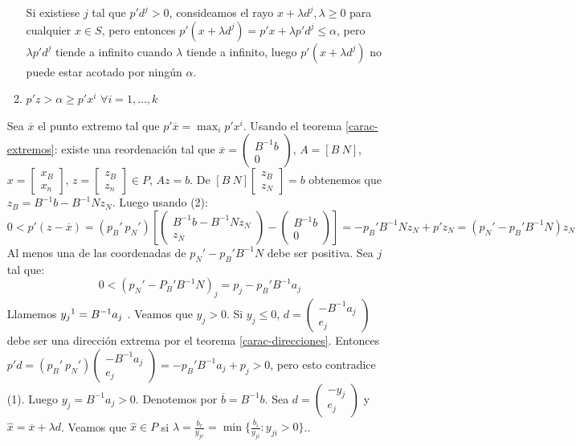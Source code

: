 \documentclass[PM.tex]{subfiles}
\begin{document}
\begin{dem}
\begin{itemize}
\begin{enumerate}
		Si existiese $j$ tal que $p'd^j > 0$, consideamos el rayo $x + λd^j, λ ≥ 0$ para cualquier $x \in S$, pero entonces $p'(x+λd^j) = p'x + λp'd^j ≤ α$, pero $λp'd^j$ tiende a infinito cuando $λ$ tiende a infinito, luego $p'(x+λd^j)$ no puede estar acotado por ningún $α$.
		\item $p'z > α ≥ p'x^i$ $\forall i=1,\dots,k$
	\end{enumerate}
	Sea $\overline{x}$ el punto extremo tal que $p'\overline{x} = \max_i p'x^i$. Usando el teorema \ref{carac-extremos}: existe una reordenación tal que $\overline{x} = \begin{pmatrix}B^{-1}b\\0\end{pmatrix}$, $A = [B\ N]$, $x = \begin{bmatrix}x_B\\x_n\end{bmatrix}$, $z = \begin{bmatrix}z_B\\z_n\end{bmatrix} \in P$, $Az=b$. De $[B\ N]\begin{bmatrix}z_B\\z_N\end{bmatrix} = b$ obtenemos que $z_B = B^{-1}b-B^{-1}Nz_N$. Luego usando (2):
	\[ 0 < p'(z-\overline{x}) = (p_B'\ p_N') \left[\begin{pmatrix}B^{-1}b-B^{-1}Nz_N\\z_N\end{pmatrix}-\begin{pmatrix}B^{-1}b\\0\end{pmatrix}\right] =-p_B'B^{-1}Nz_N + p'z_N = (p_N'-p_B'B^{-1}N)z_N \]
	Al menos una de las coordenadas de $p_N'-p_B'B^{-1}N$ debe ser positiva. Sea $j$ tal que:
	\[ 0 < (p_N'-P_B'B^{-1}N)_j = p_j - p_B'B^{-1}a_j \]
	Llamemos $y_j\footnote{\url{https://www.youtube.com/watch?v=q6EoRBvdVPQ}} = B^{-1}a_j$ . Veamos que $y_j > 0$. Si $y_j ≤ 0$, $d = \begin{pmatrix}-B^{-1}a_j\\e_j\end{pmatrix}$ debe ser una dirección extrema por el teorema \ref{carac-direcciones}. Entonces $p'd = (p_B'\ p_N')\begin{pmatrix}-B^{-1}a_j\\e_j\end{pmatrix}=-p_B'B^{-1}a_j + p_j > 0$, pero esto contradice (1). Luego $y_j = B^{-1}a_j > 0$. Denotemos por $\overline{b}=B^{-1}b$. Sea $d = \begin{pmatrix}-y_j\\e_j\end{pmatrix}$ y $\hat{x} = \overline{x} + λd$. Veamos que $\hat{x} \in P$ si $λ = \frac{\overline{b}_r}{y_{jr}} = \min\{\frac{\overline{b}_i}{y_{ji}} : y_{ji} > 0\}$..

\end{itemize}
\end{dem}
\end{document}
